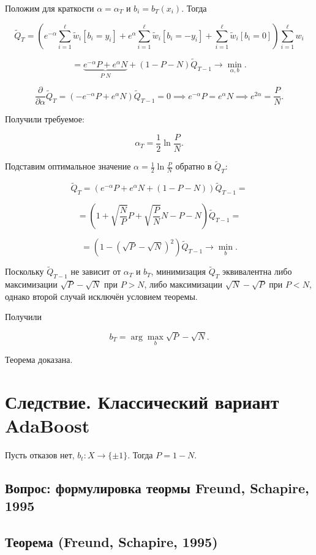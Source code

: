 Положим для краткости \(\alpha = \alpha_T\) и \(b_i = b_T(x_i)\). Тогда

\[
\widetilde{Q}_T = \left(e^{-\alpha} \sum_{i=1}^\ell \widetilde{w}_i[b_i = y_i] + e^{\alpha} \sum_{i=1}^\ell \widetilde{w}_i[b_i = -y_i] + \sum_{i=1}^\ell \widetilde{w}_i[b_i = 0]\right) \sum_{i=1}^\ell w_i
\]

\[
= \underbrace{e^{-\alpha} P + e^{\alpha} N}_{P \; N} + (1 - P - N) \widetilde{Q}_{T-1} \rightarrow \min_{\alpha, b}.
\]

\[
\frac{\partial}{\partial \alpha} \widetilde{Q}_T = (-e^{-\alpha} P + e^{\alpha} N) \widetilde{Q}_{T-1} = 0 \implies e^{-\alpha} P = e^{\alpha} N \implies e^{2\alpha} = \frac{P}{N}.
\]

Получили требуемое:

\[
\alpha_T = \frac{1}{2} \ln \frac{P}{N}.
\]

Подставим оптимальное значение \(\alpha = \frac{1}{2} \ln \frac{P}{N}\) обратно в \(\widetilde{Q}_T\):

\[
\widetilde{Q}_T = (e^{-\alpha} P + e^{\alpha} N + (1 - P - N)) \widetilde{Q}_{T-1} = 
\]

\[
= \left(1 + \sqrt{\frac{N}{P}} P + \sqrt{\frac{P}{N}} N - P - N\right) \widetilde{Q}_{T-1} = 
\]

\[
= \left(1 - (\sqrt{P} - \sqrt{N})^2\right) \widetilde{Q}_{T-1} \rightarrow \min_b.
\]

Поскольку \(\widetilde{Q}_{T-1}\) не зависит от \(\alpha_T\) и \(b_T\), минимизация \(\widetilde{Q}_T\) эквивалентна либо максимизации \(\sqrt{P} - \sqrt{N}\) при \(P > N\), либо максимизации \(\sqrt{N} - \sqrt{P}\) при \(P < N\), однако второй случай исключён условием теоремы.

Получили

\[
b_T = \arg \max_b \sqrt{P} - \sqrt{N}.
\]

Теорема доказана.


\section*{Следствие. Классический вариант AdaBoost}

Пусть отказов нет, $b_t : X \to \{ \pm 1 \}$. Тогда $P = 1 - N$.
\subsection*{Вопрос: формулировка теормы Freund, Schapire, 1995}
\subsection*{Теорема (Freund, Schapire, 1995)}

